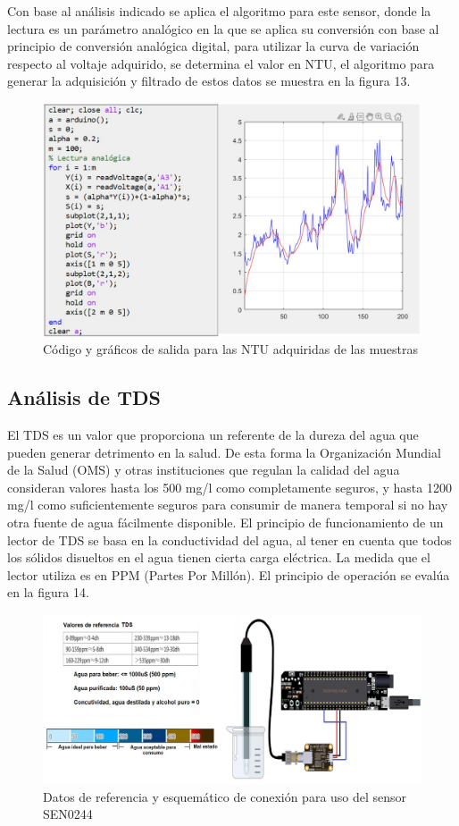 \documentclass[conference]{IEEEtran}
\begin{document}
	
Con base al análisis indicado se aplica el algoritmo para este sensor, donde la lectura es un parámetro analógico en la que se aplica su conversión con base al principio de conversión analógica digital, para utilizar la curva de variación respecto al voltaje adquirido, se determina el valor en NTU, el algoritmo para generar la adquisición y filtrado de estos datos se muestra en la figura 13.

\begin{figure}[htbp]
	\centering
	\includegraphics[width=0.8\columnwidth]{fig13.jpg}
	\caption{Código y gráficos de salida para las NTU adquiridas de las muestras}
	\label{fig:codigo-turbidez}
\end{figure}

\subsection{Análisis de TDS}

El TDS es un valor que proporciona un referente de la dureza del agua que pueden generar detrimento en la salud. De esta forma la Organización Mundial de la Salud (OMS) y otras instituciones que regulan la calidad del agua consideran valores hasta los 500 mg/l como completamente seguros, y hasta 1200 mg/l como suficientemente seguros para consumir de manera temporal si no hay otra fuente de agua fácilmente disponible. El principio de funcionamiento de un lector de TDS se basa en la conductividad del agua, al tener en cuenta que todos los sólidos disueltos en el agua tienen cierta carga eléctrica. La medida que el lector utiliza es en PPM (Partes Por Millón). El principio de operación se evalúa en la figura 14.

\begin{figure}[htbp]
	\centering
	\includegraphics[width=0.8\columnwidth]{fig14.jpg}
	\caption{Datos de referencia y esquemático de conexión para uso del sensor SEN0244}
	\label{fig:sensor-tds}
\end{figure}
\end{document}
